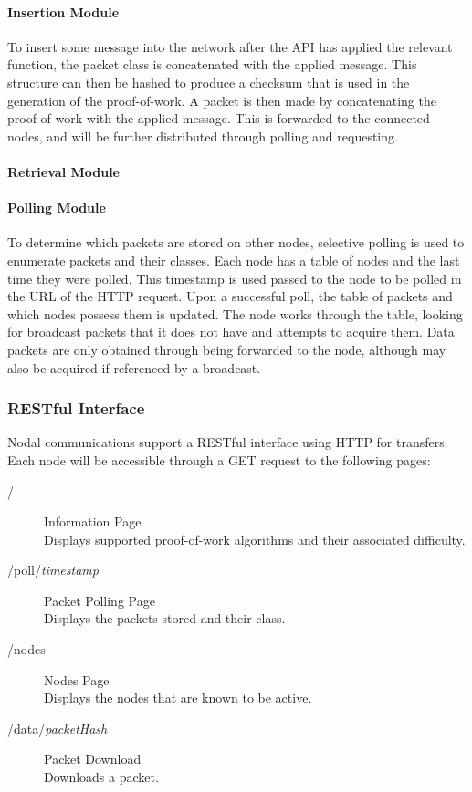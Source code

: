 			\paragraph{Insertion Module}
				To insert some message into the network after the API has applied the relevant function, the packet class is concatenated with the applied message. This structure can then be hashed to produce a checksum that is used in the generation of the proof-of-work. A packet is then made by concatenating the proof-of-work with the applied message. This is forwarded to the connected nodes, and will be further distributed through polling and requesting.
					
			\paragraph{Retrieval Module}
			\paragraph{Polling Module}
				To determine which packets are stored on other nodes, selective polling is used to enumerate packets and their classes. Each node has a table of nodes and the last time they were polled. This timestamp is used passed to the node to be polled in the URL of the HTTP request. Upon a successful poll, the table of packets and which nodes possess them is updated. The node works through the table, looking for broadcast packets that it does not have and attempts to acquire them. Data packets are only obtained through being forwarded to the node, although may also be acquired if referenced by a broadcast.
		\subsubsection*{RESTful Interface}
			Nodal communications support a RESTful interface using HTTP for transfers. Each node will be accessible through a GET request to the following pages:
			\begin{description}
				\item[/] Information Page \\ Displays supported proof-of-work algorithms and their associated difficulty.
				\item[/poll/\textit{timestamp}] Packet Polling Page \\ Displays the packets stored and their class.
				\item[/nodes] Nodes Page \\ Displays the nodes that are known to be active.
				\item[/data/\textit{packetHash}] Packet Download \\ Downloads a packet.
			\end{description}
			
